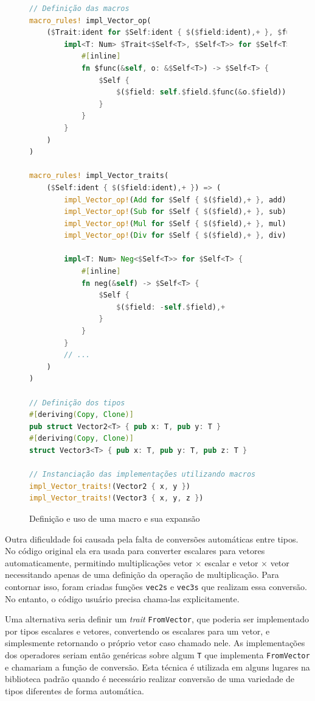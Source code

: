 \documentclass[tg]{mdtufsm}
\begin{document}
\begin{figure}
\begin{lstlisting}[language=Rust]
// Definição das macros
macro_rules! impl_Vector_op(
	($Trait:ident for $Self:ident { $($field:ident),+ }, $func:ident) => (
		impl<T: Num> $Trait<$Self<T>, $Self<T>> for $Self<T> {
			#[inline]
			fn $func(&self, o: &$Self<T>) -> $Self<T> {
				$Self {
					$($field: self.$field.$func(&o.$field)),+
				}
			}
		}
	)
)

macro_rules! impl_Vector_traits(
	($Self:ident { $($field:ident),+ }) => (
		impl_Vector_op!(Add for $Self { $($field),+ }, add)
		impl_Vector_op!(Sub for $Self { $($field),+ }, sub)
		impl_Vector_op!(Mul for $Self { $($field),+ }, mul)
		impl_Vector_op!(Div for $Self { $($field),+ }, div)

		impl<T: Num> Neg<$Self<T>> for $Self<T> {
			#[inline]
			fn neg(&self) -> $Self<T> {
				$Self {
					$($field: -self.$field),+
				}
			}
		}
		// ...
	)
)

// Definição dos tipos
#[deriving(Copy, Clone)]
pub struct Vector2<T> { pub x: T, pub y: T }
#[deriving(Copy, Clone)]
struct Vector3<T> { pub x: T, pub y: T, pub z: T }

// Instanciação das implementações utilizando macros
impl_Vector_traits!(Vector2 { x, y })
impl_Vector_traits!(Vector3 { x, y, z })
\end{lstlisting}
	\caption{Definição e uso de uma macro e sua expansão}
	\label{code:mathmacro}
\end{figure}

Outra dificuldade foi causada pela falta de conversões automáticas entre tipos. No código original ela era usada para converter escalares para vetores automaticamente, permitindo multiplicações vetor $\times$ escalar e vetor $\times$ vetor necessitando apenas de uma definição da operação de multiplicação. Para contornar isso, foram criadas funções \texttt{vec2s} e \texttt{vec3s} que realizam essa conversão. No entanto, o código usuário precisa chama-las explicitamente.

Uma alternativa seria definir um \emph{trait} \texttt{FromVector}, que poderia ser implementado por tipos escalares e vetores, convertendo os escalares para um vetor, e simplesmente retornando o próprio vetor caso chamado nele. As implementações dos operadores seriam então genéricas sobre algum \texttt{T} que implementa \texttt{FromVector} e chamariam a função de conversão. Esta técnica é utilizada em alguns lugares na biblioteca padrão quando é necessário realizar conversão de uma variedade de tipos diferentes de forma automática.
\end{document}
